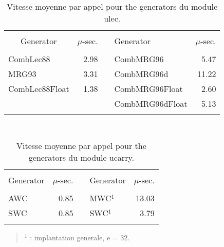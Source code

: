 \begin{table}[htb] \centering \tt
\caption {\rm Vitesse moyenne par appel pour the generators 
              du module ulec.}
\label {vitesse7}
\begin{tabular}{|l|r|c|l|r|}
\hline
&&&&\\
\multicolumn{1}{|c|}{\rm Generator} & $\mu$-sec. && {\rm Generator}
   & $\mu$-sec.\\
\hline \hline
&&&&\\
 CombLec88            &   2.98 && CombMRG96       &   5.47\\
 MRG93                &   3.31 && CombMRG96d      &  11.22\\
 CombLec88Float       &   1.38 && CombMRG96Float  &   2.60\\
                      &        && CombMRG96dFloat &   5.13\\
&&&&\\
\hline
\end{tabular}

\end {table}

\begin{table}[htb] \centering \tt
\caption {\rm Vitesse moyenne par appel pour the generators 
              du module ucarry.}
\label {vitesse8a}
\begin{tabular}{|l|r|c|l|r|}
\hline
&&&&\\
\multicolumn{1}{|c|}{\rm Generator} & $\mu$-sec. && {\rm Generator}
   & $\mu$-sec.\\
\hline \hline
&&&&\\
 AWC                  &   0.85 && MWC$^1$      &  13.03\\
 SWC                  &   0.85 && SWC$^1$      &   3.79\\
&&&&\\
\hline
\end{tabular}

\begin {verse} 
 $^1$ : implantation generale, e = 32.\\
\end {verse} 
\end {table}


